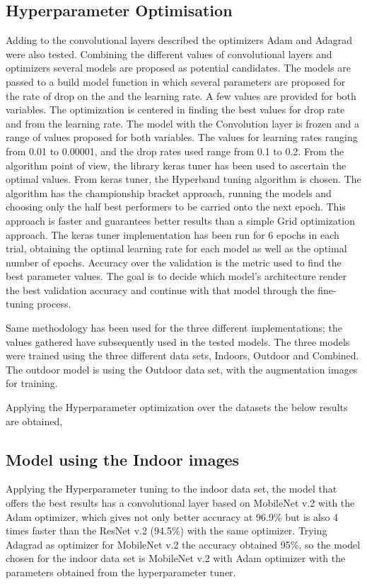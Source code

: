 \documentclass[conference]{IEEEtran}
\begin{document}
\subsection{Hyperparameter Optimisation}
Adding to the convolutional layers described the optimizers Adam and Adagrad were also tested. Combining the different values of convolutional layers and optimizers several models are proposed as potential candidates. The models are passed to a build model function in which several parameters are proposed for the rate of drop on the and the learning rate. A few values are provided for both variables. The optimization is centered in finding the best values for drop rate and from the learning rate. The model with the Convolution layer is frozen and a range of values proposed for both variables. The values for learning rates ranging from 0.01 to 0.00001, and the drop rates used range from 0.1 to 0.2. From the algorithm point of view, the library keras tuner has been used to ascertain the optimal values. From keras tuner, the Hyperband tuning algorithm is chosen. The algorithm has the championship bracket approach, running the models and choosing only the half best performers to be carried onto the next epoch.  This approach is faster and guarantees better results than a simple Grid optimization approach.  The keras tuner implementation has been run for 6 epochs in each trial, obtaining the optimal learning rate for each model as well as the optimal number of epochs.  Accuracy over the validation is the metric used to find the best parameter values. The goal is to decide which model’s architecture render the best validation accuracy and continue with that model through the fine-tuning process.\ 

Same methodology has been used for the three different implementations; the values gathered have subsequently used in the tested models. The three models were trained using the three different data sets, Indoors, Outdoor and Combined. The outdoor model is using the Outdoor data set, with the augmentation images for training.\ 

Applying the Hyperparameter optimization over the datasets the below results are obtained, 

\subsection{Model using the Indoor images}
Applying the Hyperparameter tuning to the indoor data set, the model that offers the best results has a convolutional layer based on MobileNet v.2 with the Adam optimizer, which gives not only better accuracy at 96.9\% but is also 4 times faster than the ResNet v.2 (94.5\%) with the same optimizer. Trying Adagrad as optimizer for MobileNet v.2  the accuracy obtained 95\%, so the model chosen for the indoor data set is MobileNet v.2 with Adam optimizer with the parameters obtained from the hyperparameter tuner. \
\end{document}
